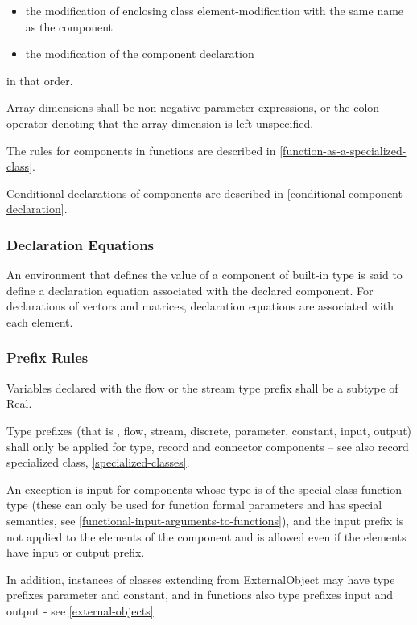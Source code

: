 \documentclass[10pt,a4paper]{report}
\def\doublelabel#1{\label{#1}}
\begin{document}
\begin{itemize}
\item
  the modification of enclosing class element-modification with the same
  name as the component
\item
  the modification of the component declaration
\end{itemize}
in that order.

Array dimensions shall be non-negative parameter expressions, or the
colon operator denoting that the array dimension is left unspecified.

The rules for components in functions are described in \ref{function-as-a-specialized-class}.

Conditional declarations of components are described in \ref{conditional-component-declaration}.

\subsubsection{Declaration Equations}\doublelabel{declaration-equations}

An environment that defines the value of a component of built-in type is
said to define a declaration equation associated with the declared
component. For declarations of vectors and matrices, declaration
equations are associated with each element.

\subsubsection{Prefix Rules}\doublelabel{prefix-rules}

Variables declared with the flow or the stream type prefix shall be a
subtype of Real.

Type prefixes (that is , flow, stream, discrete, parameter, constant,
input, output) shall only be applied for type, record and connector
components -- see also record specialized class, \ref{specialized-classes}.

An exception is input for components whose type is of the special class
function type (these can only be used for function formal parameters and
has special semantics, see \ref{functional-input-arguments-to-functions}), and the input prefix is not
applied to the elements of the component and is allowed even if the
elements have input or output prefix.

In addition, instances of classes extending from ExternalObject may have
type prefixes parameter and constant, and in functions also type
prefixes input and output - see \ref{external-objects}.
\end{document}
